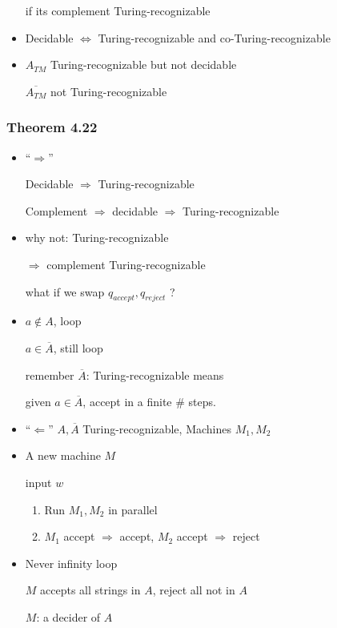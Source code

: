 \begin{frame}[allowframebreaks]
\begin{itemize}
if its complement Turing-recognizable
\item Decidable $\Leftrightarrow$
Turing-recognizable and co-Turing-recognizable
\item $A_{TM}$ Turing-recognizable but not decidable

$\overline{A_{TM}}$ not Turing-recognizable

\end{itemize}\end{frame} \begin{frame}[allowframebreaks] \frametitle{Theorem 4.22}
  \begin{itemize}
\item ``$\Rightarrow$''

Decidable $\Rightarrow$ Turing-recognizable

Complement $\Rightarrow$ decidable $\Rightarrow$
Turing-recognizable


\item why not: Turing-recognizable

$\Rightarrow$ complement Turing-recognizable

what if we swap $q_{accept},q_{reject}$ ?

\item $a \notin A$, loop

$a \in \overline{A}$, still loop

remember $\overline{A}$: Turing-recognizable means

given $a \in \overline{A}$, accept in a finite \#
steps.

\item ``$\Leftarrow$'' $A,\overline{A}$ Turing-recognizable,
Machines $M_1, M_2$
\item A new machine $M$

input $w$
\begin{enumerate}
\item Run $M_1,M_2$ in parallel
\item $M_1$ accept $\Rightarrow$ accept, 
$M_2$ accept $\Rightarrow$ reject
\end{enumerate}
\item Never infinity loop

$M$ accepts all strings in $A$, reject all not in $A$

$M$: a decider of $A$

\end{itemize}\end{frame}



